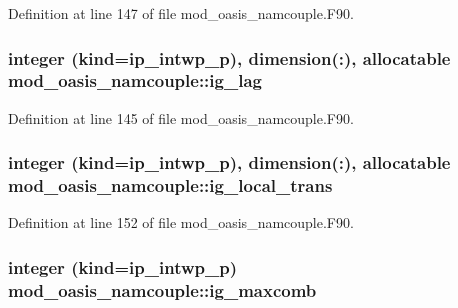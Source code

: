 Definition at line 147 of file mod\+\_\+oasis\+\_\+namcouple.\+F90.

\hypertarget{classmod__oasis__namcouple_ae2c74692147a54b3f7534301d509f766}{
\subsubsection[{ig\+\_\+lag}]{\setlength{\rightskip}{0pt plus 5cm}integer (kind=ip\+\_\+intwp\+\_\+p), dimension(\+:), allocatable mod\+\_\+oasis\+\_\+namcouple\+::ig\+\_\+lag\hspace{0.3cm}{\ttfamily [private]}}}\label{classmod__oasis__namcouple_ae2c74692147a54b3f7534301d509f766}


Definition at line 145 of file mod\+\_\+oasis\+\_\+namcouple.\+F90.

\hypertarget{classmod__oasis__namcouple_a510a13e57f2f65d5ddc70c729d54c0f6}{
\subsubsection[{ig\+\_\+local\+\_\+trans}]{\setlength{\rightskip}{0pt plus 5cm}integer (kind=ip\+\_\+intwp\+\_\+p), dimension(\+:), allocatable mod\+\_\+oasis\+\_\+namcouple\+::ig\+\_\+local\+\_\+trans\hspace{0.3cm}{\ttfamily [private]}}}\label{classmod__oasis__namcouple_a510a13e57f2f65d5ddc70c729d54c0f6}


Definition at line 152 of file mod\+\_\+oasis\+\_\+namcouple.\+F90.

\hypertarget{classmod__oasis__namcouple_abba00866a740567bc1d93cf5850042fd}{
\subsubsection[{ig\+\_\+maxcomb}]{\setlength{\rightskip}{0pt plus 5cm}integer (kind=ip\+\_\+intwp\+\_\+p) mod\+\_\+oasis\+\_\+namcouple\+::ig\+\_\+maxcomb\hspace{0.3cm}{\ttfamily [private]}}}\label{classmod__oasis__namcouple_abba00866a740567bc1d93cf5850042fd}


